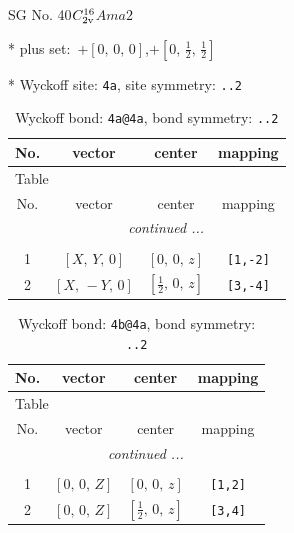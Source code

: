 \documentclass[fleqn,8pt]{jsarticle}
\begin{document}
\setcounter{MaxMatrixCols}{32}

\renewcommand{\tablename}{Table~}
\renewcommand{\figurename}{Figure~}
\begin{center}
\LARGE
SG No. 40\quad$C_{\rm 2v}^{16}$\quad$Ama2$\quad[ orthorhombic ]
\end{center}

* plus set:\,\,\,$+\left[ 0,\, 0,\, 0 \right]$,\quad $+\left[ 0,\, \frac{1}{2},\, \frac{1}{2} \right]$


* Wyckoff site: {\tt 4a}, site symmetry: {\tt ..2}
\renewcommand{\arraystretch}{1.2}
\begin{longtable}{cccc}
\caption{Wyckoff bond: {\tt 4a@4a}, bond symmetry: {\tt ..2}}
 \\
 \hline \hline
No. & vector & center & mapping \\ \hline \endfirsthead

\multicolumn{3}{l}{\tablename\ \thetable{}} \\
 \hline \hline
No. & vector & center & mapping \\ \hline \endhead

 \hline \hline
\multicolumn{3}{r}{\footnotesize\it continued ...} \\ \endfoot

 \hline \hline
\multicolumn{3}{r}{} \\ \endlastfoot

1 & $\left[ X,\, Y,\, 0 \right]$ & $\left[ 0,\, 0,\, z \right]$ & {\tt [1,-2]} \\ \hline
2 & $\left[ X,\, - Y,\, 0 \right]$ & $\left[ \frac{1}{2},\, 0,\, z \right]$ & {\tt [3,-4]} \\
\end{longtable}
\renewcommand{\arraystretch}{1.2}
\begin{longtable}{cccc}
\caption{Wyckoff bond: {\tt 4b@4a}, bond symmetry: {\tt ..2}}
 \\
 \hline \hline
No. & vector & center & mapping \\ \hline \endfirsthead

\multicolumn{3}{l}{\tablename\ \thetable{}} \\
 \hline \hline
No. & vector & center & mapping \\ \hline \endhead

 \hline \hline
\multicolumn{3}{r}{\footnotesize\it continued ...} \\ \endfoot

 \hline \hline
\multicolumn{3}{r}{} \\ \endlastfoot

1 & $\left[ 0,\, 0,\, Z \right]$ & $\left[ 0,\, 0,\, z \right]$ & {\tt [1,2]} \\ \hline
2 & $\left[ 0,\, 0,\, Z \right]$ & $\left[ \frac{1}{2},\, 0,\, z \right]$ & {\tt [3,4]} \\
\end{longtable}
\end{document}
